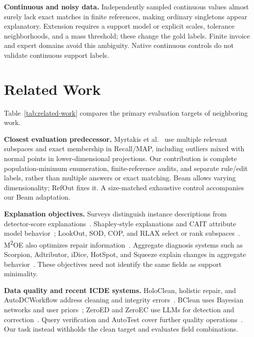\documentclass[conference]{IEEEtran}
\begin{document}
\textbf{Continuous and noisy data.} Independently sampled continuous values almost surely lack exact matches in finite references, making ordinary singletons appear explanatory. Extension requires a support model or explicit scales, tolerance neighborhoods, and a mass threshold; these change the gold labels. Finite invoice and expert domains avoid this ambiguity. Native continuous controls do not validate continuous support labels.

\section{Related Work}
Table~\ref{tab:related-work} compares the primary evaluation targets of neighboring work.

\textbf{Closest evaluation predecessor.} Myrtakis et al.~\cite{myrtakis2021comparative} use multiple relevant subspaces and exact membership in Recall/MAP, including outliers mixed with normal points in lower-dimensional projections. Our contribution is complete population-minimum enumeration, finite-reference audits, and separate rule/edit labels, rather than multiple answers or exact matching. Beam allows varying dimensionality; RefOut fixes it. A size-matched exhaustive control accompanies our Beam adaptation.



\textbf{Explanation objectives.} Surveys distinguish instance descriptions from detector-score explanations~\cite{panjei2022survey,li2024xadsurvey}. Shapley-style explanations and CAIT attribute model behavior~\cite{kluttermann2024shapley,mok2025cait}; LookOut, SOD, COP, and RLAX select or rank subspaces~\cite{gupta2018lookout,kriegel2009sod,kriegel2012cop,amirato2026rlax}. M\textsuperscript{2}OE also optimizes repair information~\cite{angiulli2024m2oe}. Aggregate diagnosis systems such as Scorpion, Adtributor, iDice, HotSpot, and Squeeze explain changes in aggregate behavior~\cite{wu2013scorpion,bhagwan2014adtributor,lin2016idice,sun2018hotspot,li2019squeeze}. These objectives need not identify the same fields as support minimality.

\textbf{Data quality and recent ICDE systems.} HoloClean, holistic repair, and AutoDCWorkflow address cleaning and integrity errors~\cite{rekatsinas2017holoclean,chu2013holistic,li2025autodcworkflow}. BClean uses Bayesian networks and user priors~\cite{qin2024bclean}; ZeroED and ZeroEC use LLMs for detection and correction~\cite{ni2025zeroed,wu2025zeroec}. Query verification and AutoTest cover further quality operations~\cite{schreiber2026verification,chen2025autotest}. Our task instead withholds the clean target and evaluates field combinations.
\end{document}
